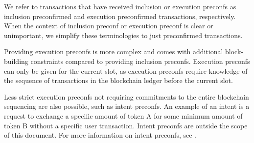 \documentclass[a4paper]{article}
\theoremstyle{boldstyle}
\newtheorem{definitionx}{Definition}
\newenvironment{definition}
  {\begin{defopenboxq}\begin{definitionx}}
  {\end{definitionx}\end{defopenboxq}}
\newcommand{\cm}[1]{\textcolor{blue}{\textbf{Conor:} #1}}
\begin{document}
        We refer to transactions that have received inclusion or execution preconfs as inclusion preconfirmed and execution preconfirmed transactions, respectively. When the context of inclusion preconf or execution preconf is clear or unimportant, we simplify these terminologies to just preconfirmed transactions.
        
        Providing execution preconfs is more complex and comes with additional block-building constraints compared to providing inclusion preconfs. Execution preconfs can only be given for the current slot, as execution preconfs require knowledge of the sequence of transactions in the blockchain ledger before the current slot.  
        
        Less strict execution preconfs not requiring commitments to the entire blockchain sequencing are also possible, such as intent preconfs. An example of an intent is a request to exchange a specific amount of token A for some minimum amount of token B without a specific user transaction. Intent preconfs are outside the scope of this document. For more information on intent preconfs, see \cite{W:Intent-BasedArchitectureandTheirRisks, ERC-7521}.


    
\end{document}
